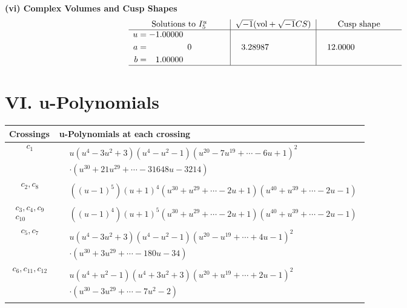 \documentclass[1p]{elsarticle_modified}
\theoremstyle{definition}
\newcommand{\I}{\sqrt{-1}}
\begin{document}
\newpage\flushleft \textbf{(vi) Complex Volumes and Cusp Shapes}
$$\begin{array}{c|c|c}  
\text{Solutions to }I^u_{5}& \I (\text{vol} + \sqrt{-1}CS) & \text{Cusp shape}\\
 \hline 
\begin{aligned}
u &= -1.00000\phantom{ +0.000000I} \\
a &= \phantom{-0.000000 } 0 \\
b &= \phantom{-}1.00000\phantom{ +0.000000I}\end{aligned}
 & \phantom{-}3.28987\phantom{ +0.000000I} & \phantom{-}12.0000\phantom{ +0.000000I}\\
 \hline 
 \end{array}$$\newpage
\newpage\renewcommand{\arraystretch}{1}
\centering \section*{ VI. u-Polynomials}
\begin{tabular}{m{50pt}|m{274pt}}
Crossings & \hspace{64pt}u-Polynomials at each crossing \\
\hline $$\begin{aligned}c_{1}\end{aligned}$$&$\begin{aligned}
&u(u^4-3 u^2+3)(u^4- u^2-1)(u^{20}-7 u^{19}+\cdots-6 u+1)^{2}\\
&\cdot(u^{30}+21 u^{29}+\cdots-31648 u-3214)
\end{aligned}$\\
\hline $$\begin{aligned}c_{2},c_{8}\end{aligned}$$&$\begin{aligned}
&((u-1)^5)(u+1)^4(u^{30}+u^{29}+\cdots-2 u+1)(u^{40}+u^{39}+\cdots-2 u-1)
\end{aligned}$\\
\hline $$\begin{aligned}c_{3},c_{4},c_{9}\\c_{10}\end{aligned}$$&$\begin{aligned}
&((u-1)^4)(u+1)^5(u^{30}+u^{29}+\cdots-2 u+1)(u^{40}+u^{39}+\cdots-2 u-1)
\end{aligned}$\\
\hline $$\begin{aligned}c_{5},c_{7}\end{aligned}$$&$\begin{aligned}
&u(u^4-3 u^2+3)(u^4- u^2-1)(u^{20}- u^{19}+\cdots+4 u-1)^{2}\\
&\cdot(u^{30}+3 u^{29}+\cdots-180 u-34)
\end{aligned}$\\
\hline $$\begin{aligned}c_{6},c_{11},c_{12}\end{aligned}$$&$\begin{aligned}
&u(u^4+u^2-1)(u^4+3 u^2+3)(u^{20}+u^{19}+\cdots+2 u-1)^{2}\\
&\cdot(u^{30}-3 u^{29}+\cdots-7 u^2-2)
\end{aligned}$\\
\hline
\end{tabular}\newpage\renewcommand{\arraystretch}{1}
\end{document}
